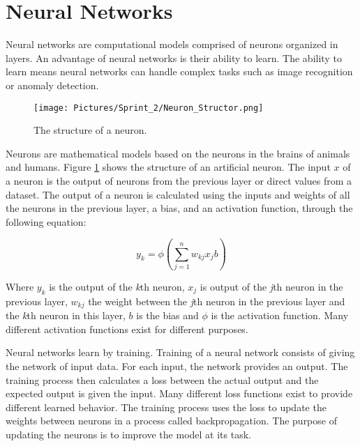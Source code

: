 \section{Neural Networks}
Neural networks are computational models comprised of neurons organized in layers. An advantage of neural networks is their ability to learn. The ability to learn means neural networks can handle complex tasks such as image recognition or anomaly detection. 

\begin{figure}[htbp]
    \centering
    \texttt{[image: Pictures/Sprint\_2/Neuron\_Structor.png]}
    \caption{The structure of a neuron.}
    \label{fig:NeuronStructor}
\end{figure}
\noindent
Neurons are mathematical models based on the neurons in the brains of animals and humans. Figure \ref{fig:NeuronStructor} shows the structure of an artificial neuron. The input $x$ of a neuron is the output of neurons from the previous layer or direct values from a dataset. The output of a neuron is calculated using the inputs and weights of all the neurons in the previous layer, a bias, and an activation function, through the following equation:

\begin{equation}
    y_k = \phi(\sum_{j=1}^{n} w_{kj} x_j b)
\end{equation}

Where $y_k$ is the output of the \textit{k}th neuron, $x_j$ is output of the \textit{j}th neuron in the previous layer, $w_{kj}$ the weight between the \textit{j}th neuron in the previous layer and the \textit{k}th neuron in this layer, $b$ is the bias and $\phi$ is the activation function. Many different activation functions exist for different purposes.

Neural networks learn by training. Training of a neural network consists of giving the network of input data. For each input, the network provides an output. The training process then calculates a loss between the actual output and the expected output is given the input. Many different loss functions exist to provide different learned behavior. The training process uses the loss to update the weights between neurons in a process called backpropagation. The purpose of updating the neurons is to improve the model at its task.